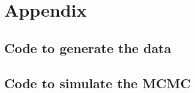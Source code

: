 \section{Appendix}
\subsection*{Code to generate the data}



\subsection{Code to simulate the MCMC}
